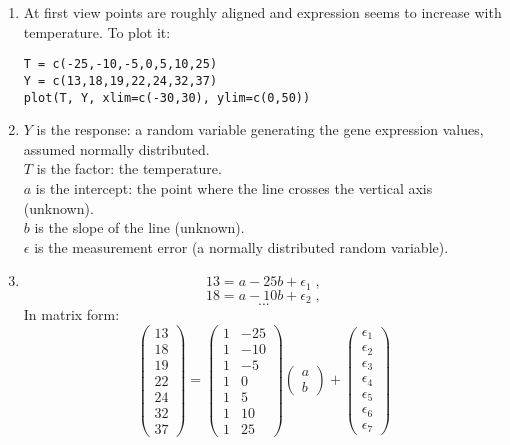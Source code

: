 \documentclass[a4paper,11pt]{article}
\begin{document}
\begin{enumerate}
\item At first view points are roughly aligned and expression seems to increase with temperature. To plot it:
\begin{verbatim}
T = c(-25,-10,-5,0,5,10,25)
Y = c(13,18,19,22,24,32,37)
plot(T, Y, xlim=c(-30,30), ylim=c(0,50))
\end{verbatim}

\item 
$Y$ is the response: a random variable generating the gene expression values, assumed normally distributed. \\
$T$ is the factor: the temperature. \\
$a$ is the intercept: the point where the line crosses the vertical axis (unknown). \\
$b$ is the slope of the line (unknown). \\
$\epsilon$ is the measurement error (a normally distributed random variable).

\item 
$$13 = a -25 b + \epsilon_1 \; ,$$
$$18 = a -10 b + \epsilon_2 \; ,$$
$$...$$
In matrix form:
$$
\left(
\begin{array}{l}
13 \\ 18 \\ 19 \\ 22 \\ 24 \\ 32 \\ 37 
\end{array}
\right)
=
\left(
\begin{array}{ccccccc}
1 & -25 \\ 
1 & -10 \\ 
1 & -5 \\ 
1 & 0 \\ 
1 & 5 \\ 
1 & 10 \\ 
1 & 25 
\end{array}
\right)
\left(
\begin{array}{c}
a \\ b
\end{array}
\right)
+
\left(
\begin{array}{l}
\epsilon_1 \\ \epsilon_2 \\ \epsilon_3 \\ \epsilon_4 \\ \epsilon_5 \\ \epsilon_6 \\ \epsilon_7 
\end{array}
\right)
$$


\end{enumerate}
\end{document}
